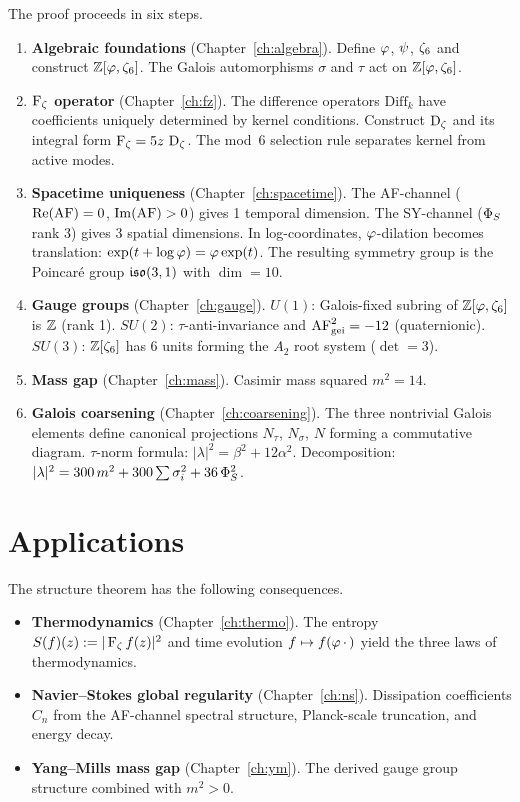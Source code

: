 The proof proceeds in six steps.
\begin{enumerate}
  \item \textbf{Algebraic foundations} (Chapter~\ref{ch:algebra}).
    Define $\varphi$, $\psi$, $\zeta_6$ and construct $\mathbb{Z}[\varphi,\zeta_6]$.
    The Galois automorphisms $\sigma$ and $\tau$ act on $\mathbb{Z}[\varphi,\zeta_6]$.
  \item \textbf{$\operatorname{F_\zeta}$ operator} (Chapter~\ref{ch:fz}).
    The difference operators $\mathrm{Diff}_k$ have coefficients
    uniquely determined by kernel conditions.
    Construct $\operatorname{D_\zeta}$ and its integral form $\operatorname{F_\zeta} = 5z\,\operatorname{D_\zeta}$.
    The mod~6 selection rule separates kernel from active modes.
  \item \textbf{Spacetime uniqueness} (Chapter~\ref{ch:spacetime}).
    The AF-channel ($\operatorname{Re}(\mathrm{AF}) = 0$, $\operatorname{Im}(\mathrm{AF}) > 0$)
    gives 1 temporal dimension.
    The SY-channel ($\Phi_S$ rank 3) gives 3 spatial dimensions.
    In log-coordinates, $\varphi$-dilation becomes translation:
    $\exp(t + \log\varphi) = \varphi\exp(t)$.
    The resulting symmetry group is the Poincar\'{e} group $\mathfrak{iso}(3,1)$
    with $\dim = 10$.
  \item \textbf{Gauge groups} (Chapter~\ref{ch:gauge}).
    $U(1)$: Galois-fixed subring of $\mathbb{Z}[\varphi,\zeta_6]$ is $\mathbb{Z}$ (rank 1).
    $SU(2)$: $\tau$-anti-invariance and $\mathrm{AF}^2_{\mathrm{gei}} = -12$
    (quaternionic).
    $SU(3)$: $\mathbb{Z}[\zeta_6]$ has 6 units forming the $A_2$ root system ($\det = 3$).
  \item \textbf{Mass gap} (Chapter~\ref{ch:mass}).
    Casimir mass squared $m^2 = 14$.
  \item \textbf{Galois coarsening} (Chapter~\ref{ch:coarsening}).
    The three nontrivial Galois elements define canonical projections
    $N_\tau$, $N_\sigma$, $N$ forming a commutative diagram.
    $\tau$-norm formula: $|\lambda|^2 = \beta^2 + 12\alpha^2$.
    Decomposition: $|\lambda|^2 = 300\,m^2 + 300\sum\sigma_i^2 + 36\,\Phi_S^2$.
\end{enumerate}

\section{Applications}

The structure theorem has the following consequences.
\begin{itemize}
  \item \textbf{Thermodynamics} (Chapter~\ref{ch:thermo}).
    The entropy $S(f)(z) := |\operatorname{F_\zeta} f(z)|^2$ and time evolution
    $f \mapsto f(\varphi\,\cdot\,)$ yield the three laws of thermodynamics.
  \item \textbf{Navier--Stokes global regularity}
    (Chapter~\ref{ch:ns}).
    Dissipation coefficients $C_n$ from the AF-channel spectral structure,
    Planck-scale truncation, and energy decay.
  \item \textbf{Yang--Mills mass gap}
    (Chapter~\ref{ch:ym}).
    The derived gauge group structure combined with $m^2 > 0$.
\end{itemize}
